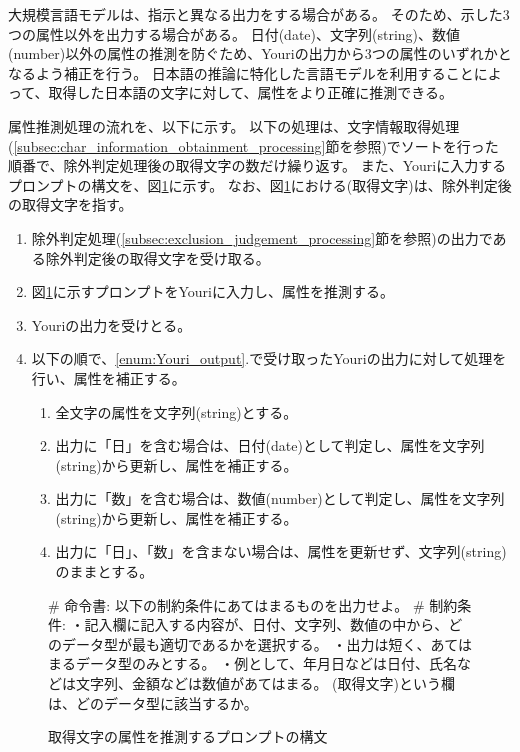 大規模言語モデルは、指示と異なる出力をする場合がある。
そのため、示した3つの属性以外を出力する場合がある。
日付(date)、文字列(string)、数値(number)以外の属性の推測を防ぐため、Youriの出力から3つの属性のいずれかとなるよう補正を行う。
日本語の推論に特化した言語モデルを利用することによって、取得した日本語の文字に対して、属性をより正確に推測できる。

属性推測処理の流れを、以下に示す。
以下の処理は、文字情報取得処理(\ref{subsec:char_information_obtainment_processing}節を参照)でソートを行った順番で、除外判定処理後の取得文字の数だけ繰り返す。
また、Youriに入力するプロンプトの構文を、図\ref{fig:prompt_struct_for_attribute_prediction}に示す。
なお、図\ref{fig:prompt_struct_for_attribute_prediction}における(取得文字)は、除外判定後の取得文字を指す。

\begin{enumerate}
    \item 除外判定処理(\ref{subsec:exclusion_judgement_processing}節を参照)の出力である除外判定後の取得文字を受け取る。
    \item 図\ref{fig:prompt_struct_for_attribute_prediction}に示すプロンプトをYouriに入力し、属性を推測する。
    \item \label{enum:Youri_output}Youriの出力を受けとる。
    \item 以下の順で、\ref{enum:Youri_output}.で受け取ったYouriの出力に対して処理を行い、属性を補正する。
        \begin{enumerate}
            \item 全文字の属性を文字列(string)とする。
            \item 出力に「日」を含む場合は、日付(date)として判定し、属性を文字列(string)から更新し、属性を補正する。
            \item 出力に「数」を含む場合は、数値(number)として判定し、属性を文字列(string)から更新し、属性を補正する。
            \item 出力に「日」、「数」を含まない場合は、属性を更新せず、文字列(string)のままとする。
        \end{enumerate}
\end{enumerate}

\begin{figure}[tp]
    \vbox{
        \vbox{\# 命令書:}
        \vbox{以下の制約条件にあてはまるものを出力せよ。}
        \vbox{\# 制約条件:}
        \vbox{・記入欄に記入する内容が、日付、文字列、数値の中から、どのデータ型が最も適切であるかを選択する。}
        \vbox{・出力は短く、あてはまるデータ型のみとする。}
        \vbox{・例として、年月日などは日付、氏名などは文字列、金額などは数値があてはまる。}
        \vbox{(取得文字)という欄は、どのデータ型に該当するか。}
    }
    \centerline{}
    \caption{取得文字の属性を推測するプロンプトの構文}
    \label{fig:prompt_struct_for_attribute_prediction}
\end{figure}

